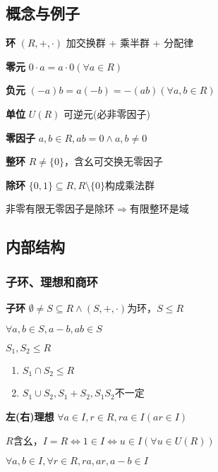 \documentclass[a4paper,10pt]{ctexart}
\newcommand*{\impl}{\Rightarrow}
\renewcommand*{\iff}{\Leftrightarrow}
\renewcommand*{\leq}{\leqslant}
\begin{document}
\begin{multicols}{3}
    \subsection{概念与例子}

    \textbf{环} $(R, +, \cdot)$ 加交换群 + 乘半群 + 分配律

    \textbf{零元} $0 \cdot a = a \cdot 0 (\forall a \in R)$

    \textbf{负元} $(-a)b = a(-b) = -(ab) (\forall a, b \in R)$

    \textbf{单位} $U(R)$ 可逆元(必非零因子)

    \textbf{零因子} $a, b \in R, ab = 0 \wedge a, b \ne 0$

    \textbf{整环} $R\ne \{0\}$，含幺可交换无零因子

    \textbf{除环} $\{0, 1\} \subseteq R, R \setminus \{0\}$构成乘法群

    非零有限无零因子是除环$\!\impl\!$有限整环是域

    \subsection{内部结构}

    \subsubsection{子环、理想和商环}

    \textbf{子环} $\emptyset \!\neq\! S \!\subseteq\! R \wedge (S, +, \cdot)$为环，$S \leq R$

    \begin{theorem}[子环判则]
        $\forall a, b \in S, a - b, ab \in S$
    \end{theorem}

    \begin{theorem}[子环运算律]
        $S_1, S_2 \leq R$
        \begin{enumerate}
            \item $S_1 \cap S_2 \leq R$
            \item $S_1 \cup S_2, S_1 + S_2, S_1S_2$不一定
        \end{enumerate}
    \end{theorem}

    \textbf{左(右)理想} $\forall a \in I, r \in R, ra \in I (ar \in I)$

    $R$含幺，$I \! = \! R \iff 1 \!\in\! I \iff u \!\in\! I (\forall u \!\in\! U(R))$

    \begin{theorem}[理想判则]
        $\forall a, b \!\in\! I, \forall r \!\in\! R, ra, ar, a-b \in I$
    \end{theorem}


\end{multicols}
\end{document}
